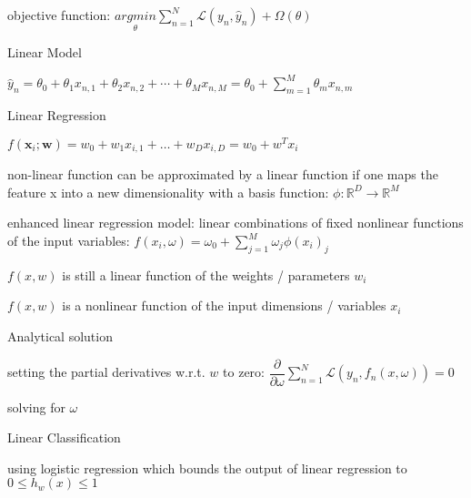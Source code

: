 \documentclass[landscape, a4paper]{article}
\begin{document}
\begin{minipage}[t]{0.2\linewidth}
\begin{betterlist}
\begin{betterlist}
			\item \alert{objective function:} $\displaystyle \underset{\theta}{argmin} \sum^N_{n=1} \mathcal{L}(y_n, \hat y_n) + \Omega(\theta)$
		\end{betterlist}
	\end{betterlist}
	\begin{betterlist}
		\item Linear Model
		\begin{betterlist}
			\item $\displaystyle \hat{y}_n=\theta_0+\theta_1 x_{n, 1}+\theta_2 x_{n, 2}+\cdots+\theta_M x_{n, M}=\theta_0+\sum_{m=1}^M \theta_m x_{n, m}$
			\item Linear Regression
			\begin{betterlist}
				\item $f\left(\mathbf{x}_i ; \mathbf{w}\right)=w_0+w_1 x_{i, 1}+\ldots+w_D x_{i, D}=w_0+w^T x_i$
				\item non-linear function can be approximated by a linear function if one maps the feature x into a new dimensionality with a \alert{basis function}: $\phi: \mathbb{R}^D\rightarrow \mathbb{R}^M$
				\item \alert{enhanced linear regression model:} linear combinations of fixed \alert{nonlinear functions} of the input variables: $\displaystyle f(x_i, \omega) = \omega_0 + \sum^{M}_{j=1} \omega_j\phi(x_i)_j$
				\begin{betterlist}
					\item $f(x, w)$ is still a \alert{linear function} of the weights / parameters $w_i$
					\item $f(x, w)$ is a \alert{nonlinear} function of the input dimensions / variables $x_i$
					\item Analytical solution
					\begin{betterlist}
						\item setting the \alert{partial derivatives} w.r.t. $w$ to zero: $\displaystyle\dfrac{\partial}{\partial \omega} \sum^N_{n=1} \mathcal{L}(y_n, f_n(x, \omega)) = 0$
						\item solving for $\omega$
					\end{betterlist}
				\end{betterlist}
			\end{betterlist}
			\item Linear Classification
			\begin{betterlist}
				\item using \alert{logistic regression} which bounds the output of linear regression to $0 \le h_w(x) \le 1$

\end{betterlist}
\end{betterlist}
\end{betterlist}
\end{minipage}
\end{document}
